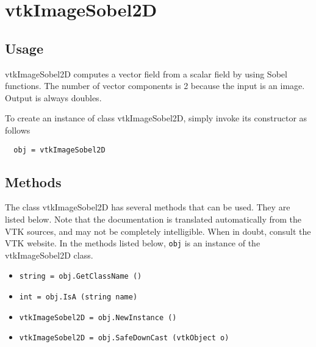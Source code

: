 \section{vtkImageSobel2D}

\subsection{Usage}

 vtkImageSobel2D computes a vector field from a scalar field by using
 Sobel functions.  The number of vector components is 2 because
 the input is an image.  Output is always doubles.

To create an instance of class vtkImageSobel2D, simply
invoke its constructor as follows
\begin{verbatim}
  obj = vtkImageSobel2D
\end{verbatim}
\subsection{Methods}

The class vtkImageSobel2D has several methods that can be used.
  They are listed below.
Note that the documentation is translated automatically from the VTK sources,
and may not be completely intelligible.  When in doubt, consult the VTK website.
In the methods listed below, \verb|obj| is an instance of the vtkImageSobel2D class.
\begin{itemize}
\item  \verb|string = obj.GetClassName ()|

\item  \verb|int = obj.IsA (string name)|

\item  \verb|vtkImageSobel2D = obj.NewInstance ()|

\item  \verb|vtkImageSobel2D = obj.SafeDownCast (vtkObject o)|

\end{itemize}
